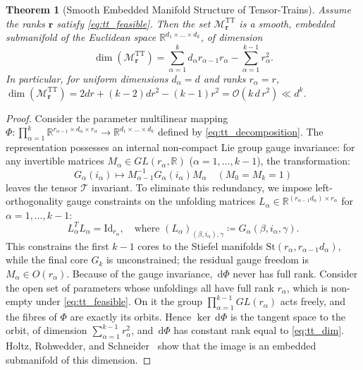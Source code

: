 \documentclass[11pt,a4paper,reqno]{amsart}
\newtheorem{theorem}{Theorem}[section]
\theoremstyle{definition}
\numberwithin{equation}{section}
\providecommand{\R}{\mathbb{R}}
\newcommand{\Id}{\mathrm{Id}}
\newcommand{\dif}{\,\mathrm{d}}
\providecommand{\R}{\mathbb{R}}
\begin{document}
\begin{theorem}[Smooth Embedded Manifold Structure of Tensor-Trains]
\label{thm:tt_manifold}
Assume the ranks $\mathbf{r}$ satisfy \eqref{eq:tt_feasible}. Then the set $\mathcal{M}_{\mathbf{r}}^{\mathrm{TT}}$ is a smooth, embedded submanifold of the Euclidean space $\R^{d_1 \times \dots \times d_k}$, of dimension
\begin{equation}
    \label{eq:tt_dim}
    \dim(\mathcal{M}_{\mathbf{r}}^{\mathrm{TT}}) = \sum_{\alpha=1}^k d_\alpha r_{\alpha-1} r_\alpha - \sum_{\alpha=1}^{k-1} r_\alpha^2.
\end{equation}
In particular, for uniform dimensions $d_\alpha = d$ and ranks $r_\alpha = r$, $\dim(\mathcal{M}_{\mathbf{r}}^{\mathrm{TT}}) = 2 d r + (k-2) d r^2 - (k-1) r^2 = \mathcal{O}(k \, d \, r^2) \ll d^k$.
\end{theorem}
\begin{proof}
Consider the parameter multilinear mapping $\Phi \colon \prod_{\alpha=1}^k \R^{r_{\alpha-1} \times d_\alpha \times r_\alpha} \to \R^{d_1 \times \dots \times d_k}$ defined by \eqref{eq:tt_decomposition}. The representation possesses an internal non-compact Lie group gauge invariance: for any invertible matrices $M_\alpha \in GL(r_\alpha, \R)$ ($\alpha = 1, \dots, k-1$), the transformation:
\begin{equation}
    \label{eq:tt_gauge_transformation}
    G_\alpha(i_\alpha) \mapsto M_{\alpha-1}^{-1} G_\alpha(i_\alpha) M_\alpha \quad (M_0 = M_k = 1)
\end{equation}
leaves the tensor $\mathcal{T}$ invariant. To eliminate this redundancy, we impose left-orthogonality gauge constraints on the unfolding matrices $L_\alpha \in \R^{(r_{\alpha-1} d_\alpha) \times r_\alpha}$ for $\alpha = 1, \dots, k-1$:
\begin{equation}
    L_\alpha^T L_\alpha = \Id_{r_\alpha}, \quad \text{where } (L_\alpha)_{(\beta, i_\alpha), \gamma} \coloneqq G_\alpha(\beta, i_\alpha, \gamma).
\end{equation}
This constrains the first $k-1$ cores to the Stiefel manifolds $\mathrm{St}(r_\alpha, r_{\alpha-1} d_\alpha)$, while the final core $G_k$ is unconstrained; the residual gauge freedom is $M_\alpha \in O(r_\alpha)$. Because of the gauge invariance, $\dif\Phi$ never has full rank. Consider the open set of parameters whose unfoldings all have full rank $r_\alpha$, which is non-empty under \eqref{eq:tt_feasible}. On it the group $\prod_{\alpha=1}^{k-1} GL(r_\alpha)$ acts freely, and the fibres of $\Phi$ are exactly its orbits. Hence $\ker \dif\Phi$ is the tangent space to the orbit, of dimension $\sum_{\alpha=1}^{k-1} r_\alpha^2$, and $\dif\Phi$ has constant rank equal to \eqref{eq:tt_dim}. Holtz, Rohwedder, and Schneider~\cite{holtz2012tensor} show that the image is an embedded submanifold of this dimension.
\end{proof}
\end{document}
